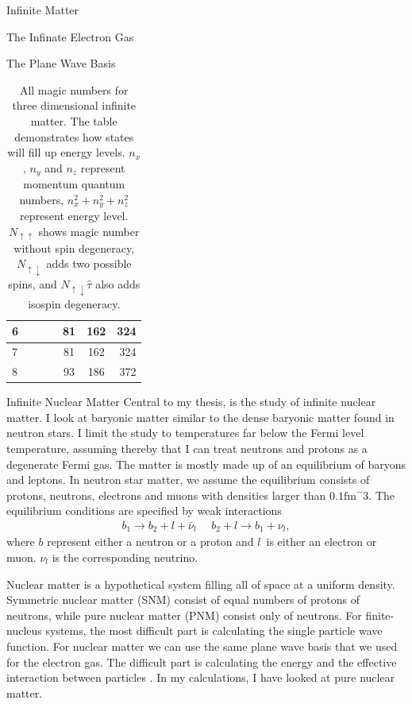 \documentclass[twoside,english]{uiofysmaster}
\begin{document}
\begin{chapter}{Infinite Matter}
\begin{section}{The Infinate Electron Gas}
\begin{subsection}{The Plane Wave Basis}
\begin{table}[H]
\begin{center}
\begin{tabular}[center]{l | c c c | c | c | r }
						\hline
						6 &   &   &   & 81&162&324\\
						\hline
						7 &   &   &   & 81&162&324\\
						\hline
						8 &   &   &   & 93&186&372
					\end{tabular}
				\end{center}
				\caption{All magic numbers for three dimensional infinite matter. The table demonstrates how states will fill up energy levels. $n_x$, $n_y$ and $n_z$ represent momentum quantum numbers, $n_x^2 + n_y^2 + n_z^2$ represent energy level. $N_{\uparrow \uparrow}$ shows magic number without spin degeneracy, $N_{\uparrow \downarrow}$ adds two possible spins, and $N_{\uparrow \downarrow} \hat \tau $ also adds isospin degeneracy.} 
				\label{Magic Numbers 3d}
			\end{table}

		\end{subsection}

	\end{section}

	\begin{section}{Infinite Nuclear Matter}
		Central to my thesis, is the study of infinite nuclear matter. I look at baryonic matter similar to the dense baryonic matter found in neutron stars. I limit the study to temperatures far below the Fermi level temperature, assuming thereby that I can treat neutrons and protons as a degenerate Fermi gas. The matter is mostly made up of an equilibrium of baryons and leptons. In neutron star matter, we assume the equilibrium consists of protons, neutrons, electrons and muons with densities larger than $0.1 \text{fm}^-3$. The equilibrium conditions are specified by weak interactions
		\begin{align}
		 	b_1 \rightarrow b_2 + l + \bar \nu_l \:\:\:\:\:\: b_2 + l \rightarrow b_1 + \nu_l,
		\end{align} 
		where $b$ represent either a neutron or a proton and $l$ is either an electron or muon. $\nu_l$ is the corresponding neutrino. 

		Nuclear matter is a hypothetical system filling all of space at a uniform density. Symmetric nuclear matter (SNM) consist of equal numbers of protons of neutrons, while pure nuclear matter (PNM) consist only of neutrons. For finite-nucleus systems, the most difficult part is calculating the single particle wave function. For nuclear matter we can use the same plane wave basis that we used for the electron gas. The difficult part is calculating the energy and the effective interaction between particles \cite{Day1967}. In my calculations, I have looked at pure nuclear matter. 
	\end{section}


\end{chapter}
\end{document}
